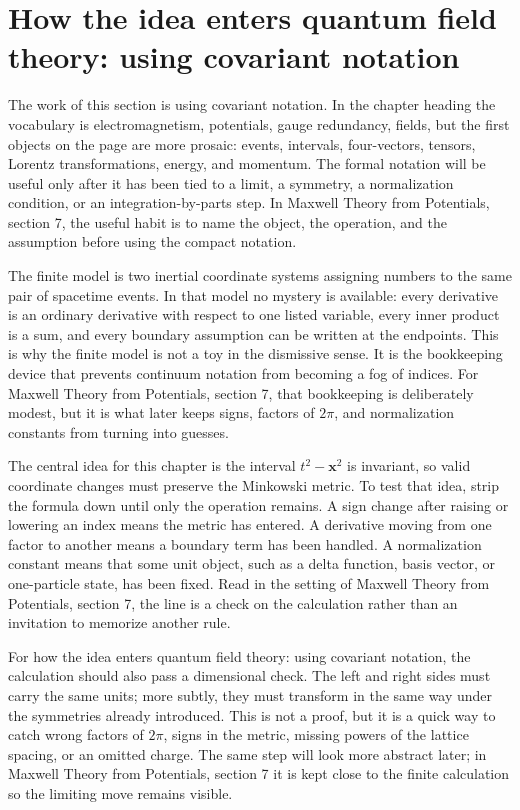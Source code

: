 \section{How the idea enters quantum field theory: using covariant notation}

The work of this section is using covariant notation.  In the chapter heading the vocabulary is electromagnetism, potentials, gauge redundancy, fields, but the first objects on the page are more prosaic: events, intervals, four-vectors, tensors, Lorentz transformations, energy, and momentum.  The formal notation will be useful only after it has been tied to a limit, a symmetry, a normalization condition, or an integration-by-parts step.  In Maxwell Theory from Potentials, section 7, the useful habit is to name the object, the operation, and the assumption before using the compact notation.

The finite model is two inertial coordinate systems assigning numbers to the same pair of spacetime events.  In that model no mystery is available: every derivative is an ordinary derivative with respect to one listed variable, every inner product is a sum, and every boundary assumption can be written at the endpoints.  This is why the finite model is not a toy in the dismissive sense.  It is the bookkeeping device that prevents continuum notation from becoming a fog of indices.  For Maxwell Theory from Potentials, section 7, that bookkeeping is deliberately modest, but it is what later keeps signs, factors of \(2\pi\), and normalization constants from turning into guesses.

The central idea for this chapter is the interval \(t^2-\bm x^2\) is invariant, so valid coordinate changes must preserve the Minkowski metric.  To test that idea, strip the formula down until only the operation remains.  A sign change after raising or lowering an index means the metric has entered.  A derivative moving from one factor to another means a boundary term has been handled.  A normalization constant means that some unit object, such as a delta function, basis vector, or one-particle state, has been fixed.  Read in the setting of Maxwell Theory from Potentials, section 7, the line is a check on the calculation rather than an invitation to memorize another rule.

For how the idea enters quantum field theory: using covariant notation, the calculation should also pass a dimensional check.  The left and right sides must carry the same units; more subtly, they must transform in the same way under the symmetries already introduced.  This is not a proof, but it is a quick way to catch wrong factors of \(2\pi\), signs in the metric, missing powers of the lattice spacing, or an omitted charge.  The same step will look more abstract later; in Maxwell Theory from Potentials, section 7 it is kept close to the finite calculation so the limiting move remains visible.

